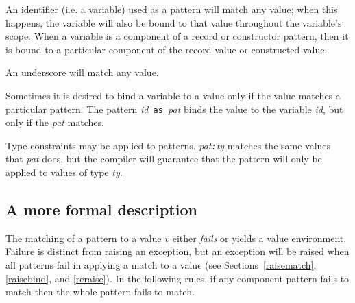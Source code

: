 An identifier (i.e. a variable)
used as a pattern will match any value; when this happens, the
variable will also be bound to that value throughout the variable's
scope.  When a variable is a component of a record or constructor
pattern, then it is bound to a particular component of the record
value or constructed value.

An underscore will match any value.

Sometimes it is desired to bind a variable to a value only
if the value matches a particular pattern.  The pattern 
{\it id}\verb" as "{\it pat} binds the value to the variable {\it
id}, but only if the {\it pat} matches.

Type constraints may be applied to patterns.  {\it pat\verb":"ty}
matches the same values that {\it pat} does, but the compiler will
guarantee that the pattern will only be applied to values  of type
{\it ty}.

\subsection*{A more formal description}
The matching of a pattern to a value $v$ either {\em fails} or yields
a value environment.  Failure is distinct from raising an exception,
but an exception will be raised when all patterns fail in applying a
match to a value (see Sections~\ref{raisematch}, \ref{raisebind}, and \ref{reraise}).  In the following rules, if any
component pattern fails to match then the whole pattern fails to
match.

